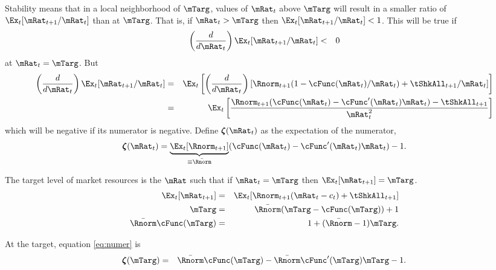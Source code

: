 \documentclass[titlepage]{\econtex}\providecommand{\texname}{BufferStockTheory}
\begin{document}
{Stability means that in a local neighborhood of $\mTarg$, values of $\mRat_{t}$
above $\mTarg$ will result in a smaller ratio of $\Ex_{t}[{\mRat}%
_{t+1}/\mRat_{t}] $ than at $\mTarg$. That is, if $\mRat_{t} > \mTarg$ then $%
\Ex_{t}[\mRat_{t+1}/\mRat_{t}] < 1 $. This will be true if
\begin{eqnarray}
\left(\frac{d}{d\mRat_t}\right) \Ex_t [{\mRat}_{t+1}/\mRat_t ] & < & 0 \label{eq:stable} \nonumber
\end{eqnarray}
at $\mRat_{t}=\mTarg$.  But \providecommand{\numFunc}{\pmb{\zeta}}
\begin{eqnarray*}
\left( \frac{d}{d\mRat_{t}}\right) \Ex_{t}[{\mRat}_{t+1}/\mRat_{t}] &=&\Ex_{t}\left[
\left( \frac{d}{d\mRat_{t}}\right) \left[ {\Rnorm}_{t+1}(1-\cFunc(\mRat_{t})/\mRat_{t})+%
{\tShkAll}_{t+1}/\mRat_{t}\right] \right]  \nonumber \\
&=&\Ex_{t}\left[ \frac{{\Rnorm}_{t+1}(\cFunc(\mRat_{t})-\cFunc^{\prime}(\mRat_{t})\mRat_{t})-%
{\tShkAll}_{t+1}}{\mRat_{t}^{2}}\right]  \notag
\end{eqnarray*}
which will be negative if its numerator is negative. Define $\numFunc(\mRat_{t})$
as the expectation of the numerator,
\begin{equation}
\numFunc (\mRat_{t})=\underbrace{\Ex_{t}[{\Rnorm}_{t+1}]}_{\equiv \bar{\Rnorm}}(\cFunc(\mRat_{t})-\cFunc^{\prime}(\mRat_{t})\mRat_{t})-1. \label{eq:numer}
\end{equation}

The target level of market resources is the $\mRat$ such that if $\mRat_{t}=\mTarg$ then $\Ex_{t}[\mRat_{t+1}]=\mTarg$.
\begin{eqnarray}
\Ex_{t}[{\mRat}_{t+1}] & = & \Ex_{t}[{\Rnorm}_{t+1}(\mRat_{t}-c_{t})+{%
\tShkAll}_{t+1}] \nonumber \\
\mTarg & = & \bar{\Rnorm}(\mTarg-\cFunc(\mTarg))+1  \nonumber \\
\bar{\Rnorm}\cFunc(\mTarg) & = & 1+(\bar{\Rnorm}-1)\mTarg  \label{eq:cstar}.
\end{eqnarray}

At the target, equation \eqref{eq:numer} is
\begin{eqnarray}
\numFunc(\mTarg) & = & \bar{\Rnorm}\cFunc(\mTarg) - \bar{\Rnorm}\cFunc^{\prime}(\mTarg)\mTarg - 1.  \label{eq:numerxstar} \nonumber
\end{eqnarray}

}
\end{document}
